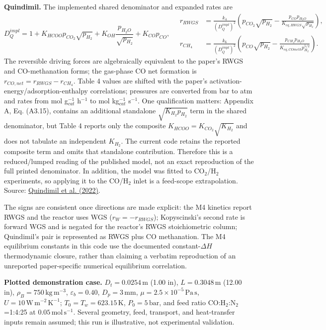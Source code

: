 \documentclass[10pt,a4paper]{article}
\begin{document}
\textbf{Quindimil.} The implemented shared denominator and expanded rates are
\[
D_Q^{impl}=1+K_{HCOO}p_{CO_2}\sqrt{p_{H_2}}+K_{OH}\frac{p_{H_2O}}{\sqrt{p_{H_2}}}+K_{CO}p_{CO},\quad
\begin{aligned}
r_{RWGS}&=\frac{k_4}{(D_Q^{impl})^2}\left(p_{CO_2}\sqrt{p_{H_2}}-\frac{p_{CO}p_{H_2O}}{K_{eq,RWGS}\sqrt{p_{H_2}}}\right),\\
r_{CH_4}&=\frac{k_6}{(D_Q^{impl})^2}\left(p_{CO}\sqrt{p_{H_2}}-\frac{p_{CH_4}p_{H_2O}}{K_{eq,COmeth}p_{H_2}^{5/2}}\right).
\end{aligned}
\]
The reversible driving forces are algebraically equivalent to the paper's RWGS and CO-methanation forms; the gas-phase CO net formation is $r_{CO,net}=r_{RWGS}-r_{CH_4}$. Table 4 values are shifted with the paper's activation-energy/adsorption-enthalpy correlations; pressures are converted from bar to atm and rates from mol g$_{cat}^{-1}$ h$^{-1}$ to mol kg$_{cat}^{-1}$ s$^{-1}$. One qualification matters: Appendix A, Eq. (A3.15), contains an additional standalone $\sqrt{K_{H_2}p_{H_2}}$ term in the shared denominator, but Table 4 reports only the composite $K_{HCOO}=K_{CO_2}\sqrt{K_{H_2}}$ and does not tabulate an independent $K_{H_2}$. The current code retains the reported composite term and omits that standalone contribution. Therefore this is a reduced/lumped reading of the published model, not an exact reproduction of the full printed denominator. In addition, the model was fitted to CO$_2$/H$_2$ experiments, so applying it to the CO/H$_2$ inlet is a feed-scope extrapolation. Source: \href{https://doi.org/10.1016/j.jcou.2022.101888}{Quindimil et al. (2022)}.

\begin{keyequation}
\small The signs are consistent once directions are made explicit: the M4 kinetics report RWGS and the reactor uses WGS ($r_W=-r_{RWGS}$); Kopyscinski's second rate is forward WGS and is negated for the reactor's RWGS stoichiometric column; Quindimil's pair is represented as RWGS plus CO methanation. The M4 equilibrium constants in this code use the documented constant-$\Delta H$ thermodynamic closure, rather than claiming a verbatim reproduction of an unreported paper-specific numerical equilibrium correlation.
\end{keyequation}

\begin{runbox}
{\small\color{white}\textbf{Plotted demonstration case.}\quad
\(D_t=0.0254\,\mathrm m\) (1.00 in), \(L=0.3048\,\mathrm m\) (12.00 in), \(\rho_B=750\,\mathrm{kg\,m^{-3}}\), \(\varepsilon_b=0.40\), \(D_p=3\,\mathrm{mm}\), \(\mu=2.5\times10^{-5}\,\mathrm{Pa\,s}\), \(U=10\,\mathrm{W\,m^{-2}\,K^{-1}}\); \(T_0=T_w=623.15\,\mathrm K\), \(P_0=5\,\mathrm{bar}\), and feed ratio CO:H\(_2\):N\(_2\)=1:4:25 at \(0.05\,\mathrm{mol\,s^{-1}}\). Several geometry, feed, transport, and heat-transfer inputs remain assumed; this run is illustrative, not experimental validation.}
\end{runbox}
\end{document}
